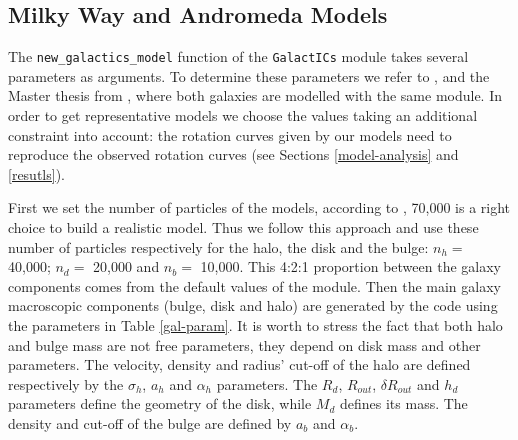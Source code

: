 \documentclass[a4paper,12pt, english]{article}
\begin{document}
\subsection{Milky Way and Andromeda Models}
\label{mw-m31-models}
The \texttt{new\_galactics\_model} function of the \texttt{GalactICs} module takes several parameters as arguments. To determine these parameters we refer to \textcite{Widrow_2005}, \textcite{Widrow_2008} and the Master thesis from \textcite{Withagen_2019}, where both galaxies are modelled with the same module. In order to get representative models we choose the values taking an additional constraint into account: the rotation curves given by our models need to reproduce the observed rotation curves (see Sections \ref{model-analysis} and \ref{resutls}).\par
\smallskip
First we set the number of particles of the models, according to \textcite{Withagen_2019}, 70,000 is a right choice to build a realistic model. Thus we follow this approach and use these number of particles respectively for the halo, the disk and the bulge: \(n_{h} =\) 40,000; \(n_{d} =\) 20,000 and \(n_{b} =\) 10,000. This 4:2:1 proportion between the galaxy components comes from the default values of the module. Then the main galaxy macroscopic components (bulge, disk and halo) are generated by the code using the parameters in Table \ref{gal-param}. It is worth to stress the fact that both halo and bulge mass are not free parameters, they depend on disk mass and other parameters. The velocity, density and radius' cut-off of the halo are defined respectively by the \(\sigma_{h}\), \(a_{h}\) and \(\alpha_{h}\) parameters. The \(R_{d}\), \(R_{out}\), \(\delta R_{out}\) and \(h_{d}\) parameters define the geometry of the disk, while \(M_{d}\) defines its mass. The density and cut-off of the bulge are defined by \(a_{b}\) and \(\alpha_{b}\).\par
\end{document}
